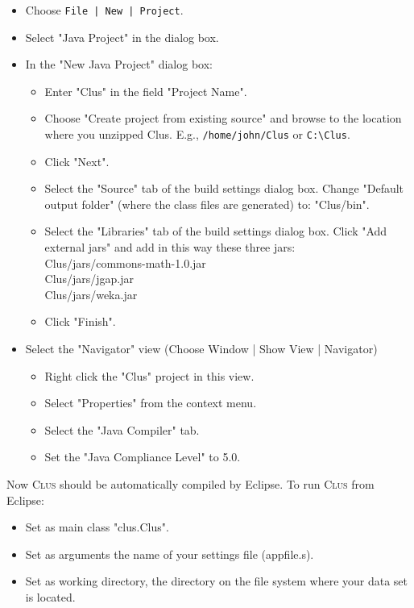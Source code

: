 \documentclass[a4paper]{report}
\newcommand{\clus}{\textsc{Clus}}
\begin{document}
\begin{itemize}
\item Choose \verb^File | New | Project^.
\item Select "Java Project" in the dialog box.
\item In the "New Java Project" dialog box:
 \begin{itemize}
 \item Enter "Clus" in the field "Project Name".
 \item Choose "Create project from existing source" and browse to the location where 
      you unzipped Clus. E.g., \verb^/home/john/Clus^ or \verb^C:\Clus^.
 \item Click "Next".
 \item Select the "Source" tab of the build settings dialog box.
     Change "Default output folder" (where the class files are generated) to: "Clus/bin".
 \item Select the "Libraries" tab of the build settings dialog box.
     Click "Add external jars" and add in this way these three jars:\\
        Clus/jars/commons-math-1.0.jar\\
        Clus/jars/jgap.jar\\
        Clus/jars/weka.jar
 \item Click "Finish".
 \end{itemize}
\item Select the "Navigator" view (Choose Window | Show View | Navigator)
 \begin{itemize}
   \item  Right click the "Clus" project in this view.
   \item  Select "Properties" from the context menu.
   \item  Select the "Java Compiler" tab.
   \item  Set the "Java Compliance Level" to 5.0.
 \end{itemize}
\end{itemize}
Now \clus{} should be automatically compiled by Eclipse.
To run \clus{} from Eclipse:
 \begin{itemize}
   \item Set as main class "clus.Clus".
   \item Set as arguments the name of your settings file (appfile.s).
   \item Set as working directory, the directory on the file system where your data set is located.
\end{itemize}
\end{document}

